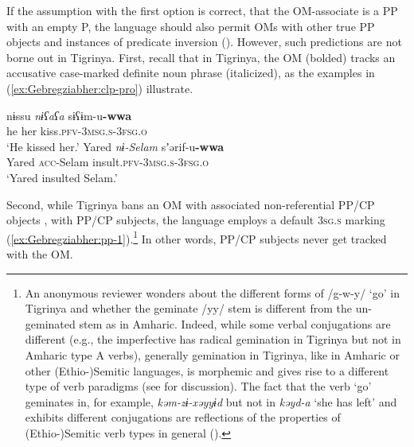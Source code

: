 \documentclass[output=paper]{langscibook}
\begin{document}
If the assumption with the first option is correct, that the OM-associate is a PP with an empty P, the language should also permit OMs with other true PP objects and instances of predicate inversion (\citealt{denDikken2006}).
However, such predictions are not borne out in Tigrinya.
First, recall that in Tigrinya, the OM (bolded) tracks an accusative case-marked definite noun phrase (italicized), as the examples in (\ref{ex:Gebregziabher:clp-pro}) illustrate.\largerpage[-1]

\ea \label{ex:Gebregziabher:clp-pro}
   \ea \gll nɨssu \textit{nɨʕaʕa} sɨʕɨm-u{\textbf{-wwa}}\\
   he her kiss.{\scshape pfv-3msg.s-3fsg.o}\\
   \glt `He kissed her.' 
   \ex \gll Yared \textit{nɨ-Selam} sʼərif-u{\textbf{-wwa}}\\
   Yared {\scshape acc}-Selam insult.{\scshape pfv-3msg.s-3fsg.o}\\
   \glt `Yared insulted Selam.'
   \z
\z

Second, while Tigrinya bans an OM with associated non-referential PP/CP objects , with PP/CP subjects, the language employs a default {\scshape 3sg.s} marking (\ref{ex:Gebregziabher:pp-1}).\footnote{An anonymous reviewer wonders about the different forms of /g-w-y/ `go' in Tigrinya and whether the geminate /yy/ stem is different from the un-geminated stem as in Amharic. Indeed, while some verbal conjugations are different (e.g., the imperfective has radical gemination in Tigrinya but not in Amharic type A verbs), generally gemination in Tigrinya, like in Amharic or other (Ethio-)Semitic languages, is morphemic and gives rise to a different type of verb paradigms (see \citealt{berhane91} for discussion). The fact that the verb `go' geminates in, for example, \emph{kəm-zɨ-xəyyɨd} but not in \emph{kəyd-a} `she has left' and exhibits different conjugations are reflections of the properties of (Ethio-)Semitic verb types in general (\citealt{hetzron1972}).} In other words, PP/CP subjects never get tracked with the OM.
\end{document}
